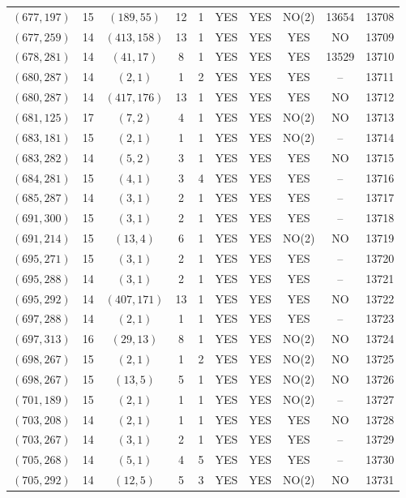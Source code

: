 \begin{longtable}{|c|c|c|c|c|c|c|c|c|c|}
$(677, 197)$ & 15 & $(189, 55)$ & 12 & 1 & YES & YES & NO(2) & 13654 & 13708\\
$(677, 259)$ & 14 & $(413, 158)$ & 13 & 1 & YES & YES & YES & NO & 13709\\
$(678, 281)$ & 14 & $(41, 17)$ & 8 & 1 & YES & YES & YES & 13529 & 13710\\
$(680, 287)$ & 14 & $(2, 1)$ & 1 & 2 & YES & YES & YES & -- & 13711\\
$(680, 287)$ & 14 & $(417, 176)$ & 13 & 1 & YES & YES & YES & NO & 13712\\
$(681, 125)$ & 17 & $(7, 2)$ & 4 & 1 & YES & YES & NO(2) & NO & 13713\\
$(683, 181)$ & 15 & $(2, 1)$ & 1 & 1 & YES & YES & NO(2) & -- & 13714\\
$(683, 282)$ & 14 & $(5, 2)$ & 3 & 1 & YES & YES & YES & NO & 13715\\
$(684, 281)$ & 15 & $(4, 1)$ & 3 & 4 & YES & YES & YES & -- & 13716\\
$(685, 287)$ & 14 & $(3, 1)$ & 2 & 1 & YES & YES & YES & -- & 13717\\
$(691, 300)$ & 15 & $(3, 1)$ & 2 & 1 & YES & YES & YES & -- & 13718\\
$(691, 214)$ & 15 & $(13, 4)$ & 6 & 1 & YES & YES & NO(2) & NO & 13719\\
$(695, 271)$ & 15 & $(3, 1)$ & 2 & 1 & YES & YES & YES & -- & 13720\\
$(695, 288)$ & 14 & $(3, 1)$ & 2 & 1 & YES & YES & YES & -- & 13721\\
$(695, 292)$ & 14 & $(407, 171)$ & 13 & 1 & YES & YES & YES & NO & 13722\\
$(697, 288)$ & 14 & $(2, 1)$ & 1 & 1 & YES & YES & YES & -- & 13723\\
$(697, 313)$ & 16 & $(29, 13)$ & 8 & 1 & YES & YES & NO(2) & NO & 13724\\
$(698, 267)$ & 15 & $(2, 1)$ & 1 & 2 & YES & YES & NO(2) & NO & 13725\\
$(698, 267)$ & 15 & $(13, 5)$ & 5 & 1 & YES & YES & NO(2) & NO & 13726\\
$(701, 189)$ & 15 & $(2, 1)$ & 1 & 1 & YES & YES & NO(2) & -- & 13727\\
$(703, 208)$ & 14 & $(2, 1)$ & 1 & 1 & YES & YES & YES & NO & 13728\\
$(703, 267)$ & 14 & $(3, 1)$ & 2 & 1 & YES & YES & YES & -- & 13729\\
$(705, 268)$ & 14 & $(5, 1)$ & 4 & 5 & YES & YES & YES & -- & 13730\\
$(705, 292)$ & 14 & $(12, 5)$ & 5 & 3 & YES & YES & NO(2) & NO & 13731\\

\end{longtable}
